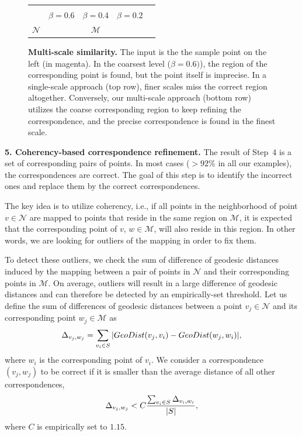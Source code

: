\begin{figure}[htb]
\begin{tabular}{c|ccc|c}
		\rotatebox{90}{Multi scale results} \\
		& $\beta=0.6$ & $\beta=0.4$ & $\beta=0.2$ \\ \hline
		$\mathcal{N}$ & \multicolumn{3}{c}{$\mathcal{M}$}
	\end{tabular}
	\caption{{\textbf{ Multi-scale similarity.}}
	The input is the the sample point on the left (in magenta).
In the coarsest level ($\beta=0.6)$), the region of the corresponding point is found, but the point itself is imprecise.
In a single-scale approach (top row), finer scales miss the correct region altogether.
Conversely, our multi-scale approach (bottom row) utilizes the coarse corresponding region to keep refining the correspondence, and the precise correspondence is found in the finest scale.
	}
	\label{fig:multiscale}
	
\end{figure}

\vspace{0.1in}
\noindent
{\textbf{ 5. Coherency-based correspondence refinement.}}
The result of Step~4 is a set of corresponding pairs of points.
In most cases ($>92\%$ in all our examples), the correspondences are correct.
The goal of this step is to identify the incorrect ones and replace them by the correct correspondences.

The key idea is to utilize coherency, i.e., if all points in the neighborhood of point $v \in \mathcal{N}$ are mapped to points that reside in the same region on $\mathcal{M}$,  it is expected that the corresponding point of $v$,  $w \in \mathcal{M}$, will also reside in this region.
In other words, we are looking for outliers of the mapping in order to fix them.

To detect these outliers, we check the sum of difference of geodesic distances induced by the mapping  between a pair of points in $\mathcal{N}$ and their corresponding points in $\mathcal{M}$. 
On average, outliers will result in a large difference of geodesic distances and can therefore be detected by an empirically-set threshold.
Let us define the sum of differences of geodesic distances between a point $v_j \in \mathcal{N}$ and its corresponding point $w_j \in \mathcal{M}$ as
\begin{equation}
	\centering
	\label{eq:refinement}
	\Delta_{v_j,w_j}=\sum_{v_i\in S}|{GeoDist(v_j,v_i)} - {GeoDist(w_j,w_i)}|,
\end{equation}
where $w_i$ is the corresponding point of $v_i$.
We consider a correspondence $(v_j,w_j)$ to be correct if it is smaller than the average distance of all other correspondences,
\begin{equation}
	\centering
	\label{eq:refinement2}
	\Delta_{v_j,w_j}<C\frac{\sum_{v_i\in S}\Delta_{v_i,w_i}}{|S|},
\end{equation}
where $C$ is empirically set to $1.15$.

